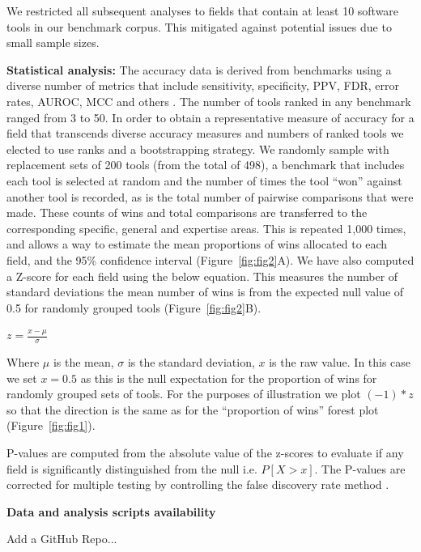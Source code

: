 \documentclass[fleqn,10pt,doc,onecolumn]{SelfArx}%
\begin{document}
We restricted all subsequent analyses to fields that contain at least 10
software tools in our benchmark corpus. This mitigated against
potential issues due to small sample sizes. 

\textbf{Statistical analysis:} The accuracy data is derived from
benchmarks using a diverse number of metrics that include sensitivity,
specificity, PPV, FDR, error rates, AUROC, MCC and others
\cite{weber2019essential}. The number of tools ranked in any benchmark
ranged from 3 to 50. In order to obtain a representative measure of
accuracy for a field that transcends diverse accuracy measures and
numbers of ranked tools we elected to use ranks and a
bootstrapping strategy.  We randomly sample with replacement sets of
200 tools (from the total of 498), a benchmark that includes each tool
is selected at random and the number of times the tool ``won'' against
another tool is recorded, as is the total number of pairwise
comparisons that were made. These counts of wins and total comparisons
are transferred to the corresponding specific, general and expertise
areas. This is repeated 1,000 times, and allows a way to estimate the
mean proportions of wins allocated to each field, and the 95\%
confidence interval (Figure~\ref{fig:fig2}A). We have also computed a
Z-score for each field using the below equation. This measures the
number of standard deviations the mean number of wins is from the
expected null value of 0.5 for randomly grouped tools
(Figure~\ref{fig:fig2}B).

$z=\frac{x-\mu}{\sigma}$




Where $\mu$ is the mean, $\sigma$ is the standard deviation, $x$ is the raw
value. In this case we set $x=0.5$ as this is the null expectation for
the proportion of wins for randomly grouped sets of tools. For the
purposes of illustration we plot $(-1)*z$ so that the direction is the
same as for the ``proportion of wins'' forest plot
(Figure~\ref{fig:fig1}). 

P-values are computed from the absolute value of the z-scores to
evaluate if any field is significantly distinguished from the null
i.e. $P[X > x]$. The P-values are corrected for multiple testing by
controlling the false discovery rate method
\cite{benjamini1995controlling}.


\noindent\textbf{Data and analysis scripts availability}

Add a GitHub Repo...
\end{document}
